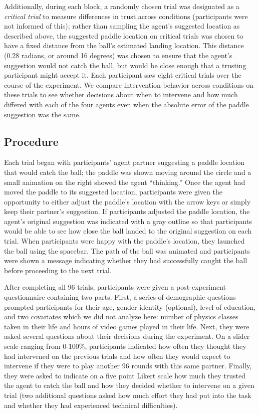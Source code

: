 \documentclass[10pt,letterpaper]{article}
\begin{document}
Additionally, during each block, a randomly chosen trial was designated as a \textit{critical trial} to measure differences in trust across conditions (participants were not informed of this); rather than sampling the agent's suggested location as described above, the suggested paddle location on critical trials was chosen to have a fixed distance from the ball's estimated landing location. This distance (0.28 radians, or around 16 degrees) was chosen to ensure that the agent's suggestion would not catch the ball, but would be close enough that a trusting participant might accept it. Each participant saw eight critical trials over the course of the experiment. We compare intervention behavior across conditions on these trials to see whether decisions about when to intervene and how much differed with each of the four agents even when the absolute error of the paddle suggestion was the same. 


\subsection{Procedure}
Each trial began with participants' agent partner suggesting a paddle location that would catch the ball; the paddle was shown moving around the circle and a small animation on the right showed the agent ``thinking.'' Once the agent had moved the paddle to its suggested location, participants were given the opportunity to either adjust the paddle's location with the arrow keys or simply keep their partner's suggestion. If participants adjusted the paddle location, the agent's original suggestion was indicated with a gray outline so that participants would be able to see how close the ball landed to the original suggestion on each trial. When participants were happy with the paddle's location, they launched the ball using the spacebar. The path of the ball was animated and participants were shown a message indicating whether they had successfully caught the ball before proceeding to the next trial. 

After completing all 96 trials, participants were given a post-experiment questionnaire containing two parts. First, a series of demographic questions prompted participants for their age, gender identity (optional), level of education, and two covariates which we did not analyze here: number of physics classes taken in their life and hours of video games played in their life. Next, they were asked several questions about their decisions during the experiment. On a slider scale ranging from 0-100\%, participants indicated how often they thought they had intervened on the previous trials and how often they would expect to intervene if they were to play another 96 rounds with this same partner. Finally, they were asked to indicate on a five point Likert scale how much they trusted the agent to catch the ball and how they decided whether to intervene on a given trial (two additional questions asked how much effort they had put into the task and whether they had experienced technical difficulties).
\end{document}
